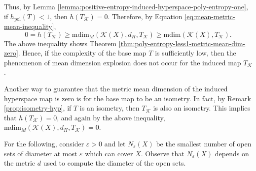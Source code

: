 \documentclass[sn-mathphys-num]{sn-jnl}%
\theoremstyle{thmstyleone}%
\theoremstyle{thmstyletwo}%
\theoremstyle{thmstylethree}%
\newcommand*\induce[1]{#1_\mathcal{K}}
\newcommand*\hyp[1]{\mathcal{#1}}
\begin{document}
Thus, by Lemma \ref{lemma:positive-entropy-induced-hyperspace-poly-entropy-one}, if $h_{\text{pol}}(T) < 1$, then $h(\induce{T}) = 0$. Therefore, by Equation \ref{eq:mean-metric-mean-inequality},
\begin{equation*}
    0 = h(\induce{T}) \geq \text{mdim}_M(\hyp{K}(X), d_H, \induce{T}) \geq \text{mdim}(\hyp{K}(X), \induce{T}).
\end{equation*}
The above inequality shows Theorem \ref{thm:poly-entropy-less1-metric-mean-dim-zero}. Hence, if the complexity of the base map $T$ is sufficiently low, then the phenomenon of mean dimension explosion does not occur for the induced map $\induce{T}$.

Another way to guarantee that the metric mean dimension of the induced hyperspace map is zero is for the base map to be an isometry. In fact, by Remark \ref{prop:isometry-hyp}, if $T$ is an isometry, then $\induce{T}$ is also an isometry. This implies that $h(\induce{T}) = 0$, and again by the above inequality, $\text{mdim}_M(\hyp{K}(X), d_H, \induce{T}) = 0$.

For the following, consider $\varepsilon > 0$ and let $N_\varepsilon(X)$ be the smallest number of open sets of diameter at most $\varepsilon$ which can cover $X$. Observe that $N_\varepsilon(X)$ depends on the metric $d$ used to compute the diameter of the open sets.\\
\end{document}
